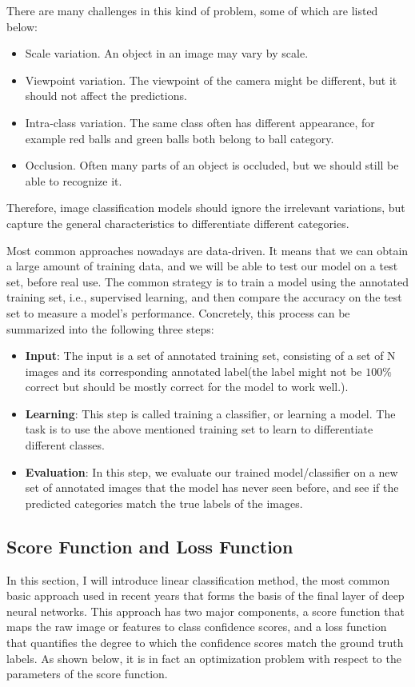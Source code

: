 There are many challenges in this kind of problem, some of which are listed below:
\begin{itemize}
	\item Scale variation. An object in an image may vary by scale.
	\item Viewpoint variation. The viewpoint of the camera might be different, but it should not affect the predictions.
	\item Intra-class variation. The same class often has different appearance, for example red balls and green balls both belong to ball category.
	\item Occlusion. Often many parts of an object is occluded, but we should still be able to recognize it.
\end{itemize}
Therefore, image classification models should ignore the irrelevant variations, but capture the general characteristics to differentiate different categories.

Most common approaches nowadays are data-driven. It means that we can obtain a large amount of training data, and we will be able to test our model on a test set, before real use. The common strategy is to train a model using the annotated training set, i.e., supervised learning, and then compare the accuracy on the test set to measure a model's performance. Concretely, this process can be summarized into the following three steps:
\begin{itemize}
	\item \textbf{Input}: The input is a set of annotated training set, consisting of a set of N images and its corresponding annotated label(the label might not be $100\%$ correct but should be mostly correct for the model to work well.).
	\item \textbf{Learning}: This step is called training a classifier, or learning a model. The task is to use the above mentioned training set to learn to differentiate different classes.
	\item \textbf{Evaluation}: In this step, we evaluate our trained model/classifier on a new set of annotated images that the model has never seen before, and see if the predicted categories match the true labels of the images. 
\end{itemize}

\subsection{Score Function and Loss Function}
In this section, I will introduce linear classification method, the most common basic approach used in recent years that forms the basis of the final layer of deep neural networks. This approach has two major components, a score function that maps the raw image or features to class confidence scores, and a loss function that quantifies the degree to which the confidence scores match the ground truth labels. As shown below, it is in fact an optimization problem with respect to the parameters of the score function.

